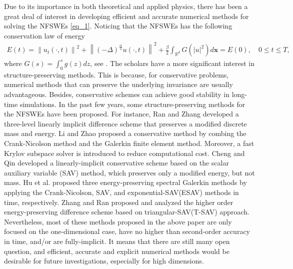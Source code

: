 \documentclass[preprint,compress,3p,10pt,fleqn]{elsarticle}
\numberwithin{equation}{section}
\begin{document}
Due to its importance in both theoretical and applied physics, there has been a great
deal of interest in developing efficient and accurate numerical methods for solving
the NFSWEs \eqref{eq_1}. Noticing that the NFSWEs has the following conservation law
of energy
\begin{align}\label{eq_9}
E(t)=\left\|u_{t}(\cdot, t)\right\|^{2}+\left\|(-\Delta)^{\frac{\alpha}{4}} u(\cdot, t)\right\|^{2}+\frac{\beta}{2} \int_{\mathbb{R}^d} G\left(|u|^2\right) d \boldsymbol{x}=E(0), \quad 0 \leq t \leq T,
\end{align}
where $G(s)=\int_0^s g(z) d z$, see \cite{baoUniformErrorEstimates2012,ranLinearlyImplicitConservative2016}.
The scholars have a more significant interest in structure-preserving methods.
This is because, for conservative problems, numerical methods that
can preserve the underlying invariance are usually advantageous. Besides, conservative
schemes can achieve good stability in long-time simulations. In the past few years, some
structure-preserving methods for the NFSWEs have been proposed. For instance, Ran and
Zhang \cite{ranLinearlyImplicitConservative2016} developed a three-level linearly implicit
difference scheme that preserves a modified discrete mass and energy.
Li and Zhao \cite{liFastEnergyConserving2018} proposed a conservative method by combing
the Crank-Nicolson method and the Galerkin finite element method. Moreover, a fast Krylov
subspace solver is introduced to reduce computational cost.
Cheng and Qin \cite{chengConvergenceEnergyconservingScheme2022} developed a linearly-implicit
conservative scheme based on the scalar auxiliary variable (SAV) method, which preserves only a modified energy,
but not mass. Hu et al. \cite{huEfficientEnergyPreserving2022} proposed three energy-preserving
spectral Galerkin methods by applying the Crank-Nicolson, SAV, and  exponential-SAV(ESAV) methods in time,
respectively. Zhang and Ran \cite{zhangHighorderStructurepreservingDifference2023} proposed and analyzed the higher order energy-preserving difference scheme based on triangular-SAV(T-SAV) approach. Nevertheless, most of these methods proposed in the above paper are only
focused on the one-dimensional case, have no higher than second-order accuracy in time,
and/or are fully-implicit. It means that there are still many open question, and efficient,
accurate and explicit numerical methods would be desirable for future investigations,
especially for high dimensions.	
\end{document}
